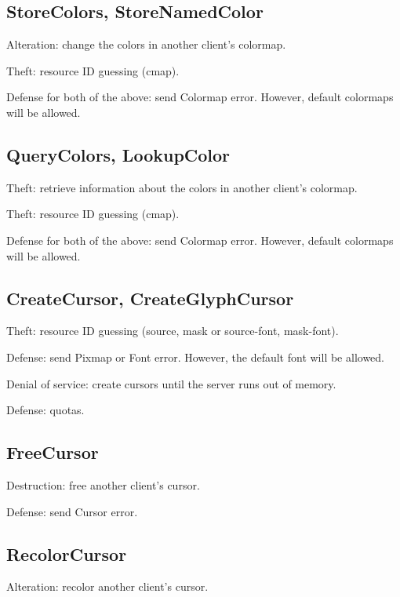 \documentclass{article}
\begin{document}
\subsection{StoreColors, StoreNamedColor}

Alteration: change the colors in another client's colormap.

Theft: resource ID guessing (cmap).

Defense for both of the above: send Colormap error.  However, default
colormaps will be allowed.



\subsection{QueryColors, LookupColor}

Theft: retrieve information about the colors in another client's
colormap.

Theft: resource ID guessing (cmap).

Defense for both of the above: send Colormap error.  However, default
colormaps will be allowed.



\subsection{CreateCursor, CreateGlyphCursor}

Theft: resource ID guessing (source, mask or source-font, mask-font).

Defense: send Pixmap or Font error.  However, the default font will be
allowed.

Denial of service: create cursors until the server runs out of memory.

Defense: quotas.



\subsection{FreeCursor}

Destruction: free another client's cursor.

Defense: send Cursor error.



\subsection{RecolorCursor}

Alteration: recolor another client's cursor.
\end{document}
